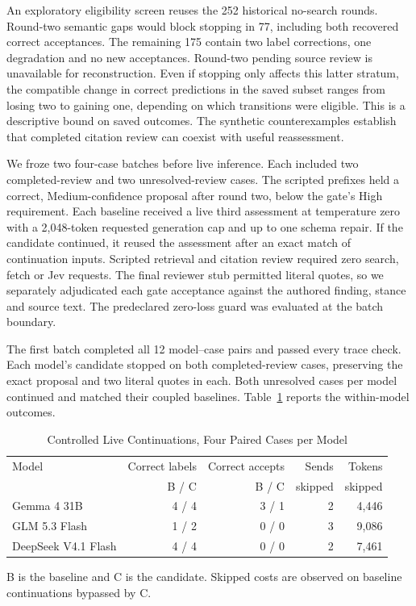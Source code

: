 \documentclass[conference]{IEEEtran}
\begin{document}
An exploratory eligibility screen reuses the 252 historical no-search rounds. Round-two semantic gaps would block stopping in 77, including both recovered correct acceptances. The remaining 175 contain two label corrections, one degradation and no new acceptances. Round-two pending source review is unavailable for reconstruction. Even if stopping only affects this latter stratum, the compatible change in correct predictions in the saved subset ranges from losing two to gaining one, depending on which transitions were eligible. This is a descriptive bound on saved outcomes. The synthetic counterexamples establish that completed citation review can coexist with useful reassessment.

We froze two four-case batches before live inference. Each included two completed-review and two unresolved-review cases. The scripted prefixes held a correct, Medium-confidence proposal after round two, below the gate's High requirement. Each baseline received a live third assessment at temperature zero with a 2,048-token requested generation cap and up to one schema repair. If the candidate continued, it reused the assessment after an exact match of continuation inputs. Scripted retrieval and citation review required zero search, fetch or Jev requests. The final reviewer stub permitted literal quotes, so we separately adjudicated each gate acceptance against the authored finding, stance and source text. The predeclared zero-loss guard was evaluated at the batch boundary.

The first batch completed all 12 model--case pairs and passed every trace check. Each model's candidate stopped on both completed-review cases, preserving the exact proposal and two literal quotes in each. Both unresolved cases per model continued and matched their coupled baselines. Table~\ref{tab:live-stop} reports the within-model outcomes.

\begin{table}[t]
\caption{Controlled Live Continuations, Four Paired Cases per Model}
\label{tab:live-stop}
\centering
\footnotesize
\setlength{\tabcolsep}{3pt}
\begin{tabular}{@{}lrrrr@{}}
\toprule
Model & Correct labels & Correct accepts & Sends & Tokens\\
 & B / C & B / C & skipped & skipped\\
\midrule
Gemma 4 31B & 4 / 4 & 3 / 1 & 2 & 4,446\\
GLM 5.3 Flash & 1 / 2 & 0 / 0 & 3 & 9,086\\
DeepSeek V4.1 Flash & 4 / 4 & 0 / 0 & 2 & 7,461\\
\bottomrule
\end{tabular}
\par\smallskip
\parbox{\columnwidth}{\footnotesize B is the baseline and C is the candidate. Skipped costs are observed on baseline continuations bypassed by C.}
\end{table}
\end{document}
